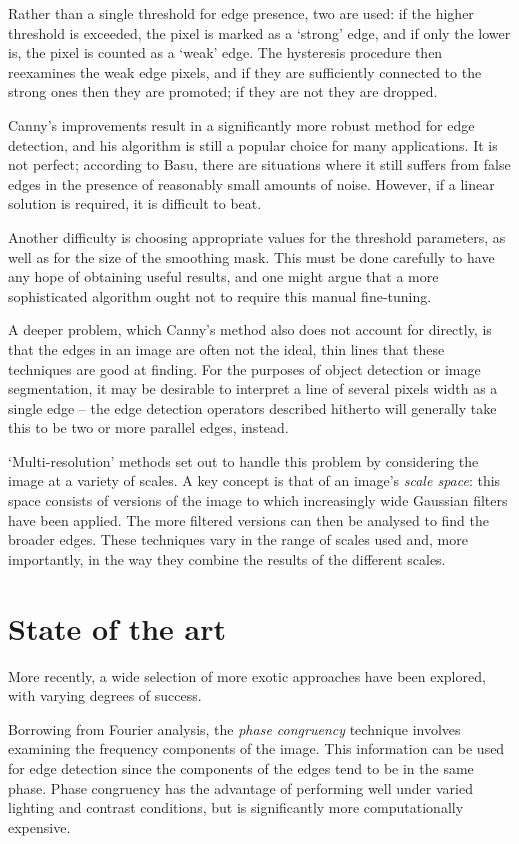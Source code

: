\documentclass{acm_proc_article-sp}
\begin{document}
Rather than a single threshold for edge presence, two are used: if the higher
threshold is exceeded, the pixel is marked as a `strong' edge, and if only the
lower is, the pixel is counted as a `weak' edge. The hysteresis procedure then
reexamines the weak edge pixels, and if they are sufficiently connected to the
strong ones then they are promoted; if they are not they are dropped.

Canny's improvements result in a significantly more robust method for edge
detection, and his algorithm is still a popular choice for many applications.
It is not perfect; according to Basu\cite{1097737}, there are situations where
it still suffers from false edges in the presence of reasonably small amounts
of noise.  However, if a linear solution is required, it is difficult to beat.

Another difficulty is choosing appropriate values for the threshold parameters,
as well as for the size of the smoothing mask. This must be done carefully to
have any hope of obtaining useful results, and one might argue that a more
sophisticated algorithm ought not to require this manual fine-tuning.

A deeper problem, which Canny's method also does not account for directly, is
that the edges in an image are often not the ideal, thin lines that these
techniques are good at finding. For the purposes of object detection or image
segmentation, it may be desirable to interpret a line of several pixels width
as a single edge -- the edge detection operators described hitherto will
generally take this to be two or more parallel edges, instead.

`Multi-resolution' methods set out to handle this problem by considering the
image at a variety of scales. A key concept is that of an image's \emph{scale
space}: this space consists of versions of the image to which increasingly wide
Gaussian filters have been applied. The more filtered versions can then be
analysed to find the broader edges. These techniques vary in the range of
scales used and, more importantly, in the way they combine the results of the
different scales.

\section{State of the art}

More recently, a wide selection of more exotic approaches have been explored,
with varying degrees of success.

Borrowing from Fourier analysis, the \emph{phase congruency}
technique\cite{Kovesi} involves examining the frequency components of the
image. This information can be used for edge detection since the components of
the edges tend to be in the same phase. Phase congruency has the advantage of
performing well under varied lighting and contrast conditions, but is
significantly more computationally expensive.
\end{document}
